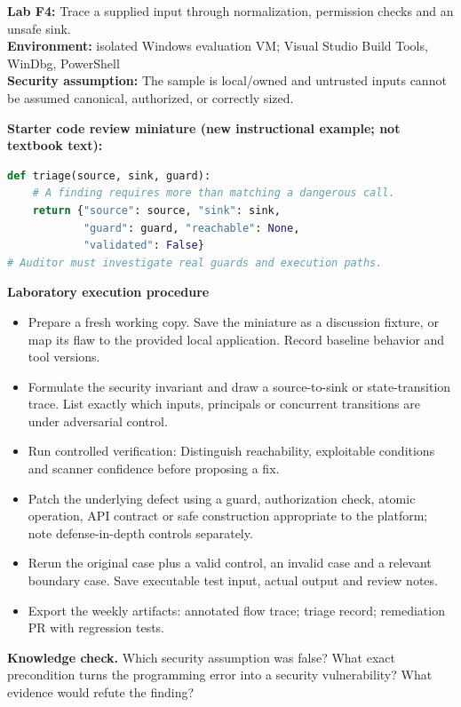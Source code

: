\documentclass[10pt,letterpaper]{article}
\begin{document}
\begin{insight}\textbf{Lab F4:} Trace a supplied input through normalization, permission checks and an unsafe sink.\\\textbf{Environment:} isolated Windows evaluation VM; Visual Studio Build Tools, WinDbg, PowerShell\\\textbf{Security assumption:} The sample is local/owned and untrusted inputs cannot be assumed canonical, authorized, or correctly sized.\end{insight}
\textbf{Starter code review miniature (new instructional example; not textbook text):}
\begin{lstlisting}[language=Python]
def triage(source, sink, guard):
    # A finding requires more than matching a dangerous call.
    return {"source": source, "sink": sink,
            "guard": guard, "reachable": None,
            "validated": False}
# Auditor must investigate real guards and execution paths.
\end{lstlisting}
\textbf{Laboratory execution procedure}
\begin{itemize}[leftmargin=*,itemsep=2pt]
\item Prepare a fresh working copy. Save the miniature as a discussion fixture, or map its flaw to the provided local application. Record baseline behavior and tool versions.
\item Formulate the security invariant and draw a source-to-sink or state-transition trace. List exactly which inputs, principals or concurrent transitions are under adversarial control.
\item Run controlled verification: Distinguish reachability, exploitable conditions and scanner confidence before proposing a fix.
\item Patch the underlying defect using a guard, authorization check, atomic operation, API contract or safe construction appropriate to the platform; note defense-in-depth controls separately.
\item Rerun the original case plus a valid control, an invalid case and a relevant boundary case. Save executable test input, actual output and review notes.
\item Export the weekly artifacts: annotated flow trace; triage record; remediation PR with regression tests.
\end{itemize}
\textbf{Knowledge check.} Which security assumption was false? What exact precondition turns the programming error into a security vulnerability? What evidence would refute the finding?
\end{document}
